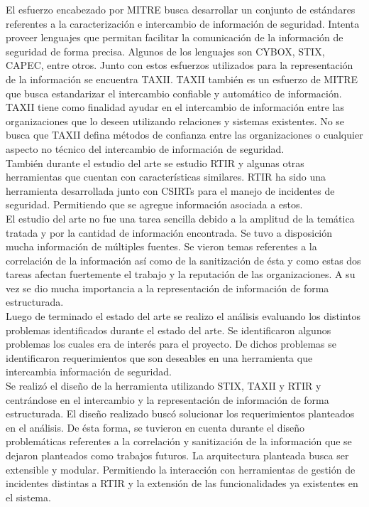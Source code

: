 El esfuerzo encabezado por MITRE busca desarrollar un conjunto de estándares referentes a la caracterización e intercambio de información de seguridad. Intenta proveer lenguajes que permitan facilitar la comunicación de la información de seguridad de forma precisa. Algunos de los lenguajes son CYBOX, STIX, CAPEC, entre otros. Junto con estos esfuerzos utilizados para la representación de la información se encuentra TAXII. TAXII también es un esfuerzo de MITRE que busca estandarizar el intercambio confiable y automático de información. TAXII tiene como finalidad ayudar en el intercambio de información entre las organizaciones que lo deseen utilizando relaciones y sistemas existentes. No se busca que TAXII defina métodos de confianza entre las organizaciones o cualquier aspecto no técnico del intercambio de información de seguridad.\\
\bigskip
También durante el estudio del arte se estudio RTIR y algunas otras herramientas que cuentan con características similares. RTIR ha sido una herramienta desarrollada junto con CSIRTs para el manejo de incidentes de seguridad. Permitiendo que se agregue información asociada a estos.\\
\bigskip
El estudio del arte no fue una tarea sencilla debido a la amplitud de la temática tratada y por la cantidad de información encontrada. Se tuvo a disposición mucha información de múltiples fuentes. Se vieron temas referentes a la correlación de la información así como de la sanitización de ésta y como estas dos tareas afectan fuertemente el trabajo y la reputación de las organizaciones. A su vez se dio mucha importancia a la representación de información de forma estructurada.\\
\bigskip
Luego de terminado el estado del arte se realizo el análisis evaluando los distintos problemas identificados durante el estado del arte. Se identificaron algunos problemas los cuales era de interés para el proyecto. De dichos problemas se identificaron requerimientos que son deseables en una herramienta que intercambia información de seguridad.\\
\bigskip
Se realizó el diseño de la herramienta utilizando STIX, TAXII y RTIR y centrándose en el intercambio y la representación de información de forma estructurada. El diseño realizado buscó solucionar los requerimientos planteados en el análisis. De ésta forma, se tuvieron en cuenta durante el diseño problemáticas referentes a la correlación y sanitización de la información que se dejaron planteados como trabajos futuros. La arquitectura planteada busca ser extensible y modular. Permitiendo la interacción con herramientas de gestión de incidentes distintas a RTIR y la extensión de las funcionalidades ya existentes en el sistema.\\
